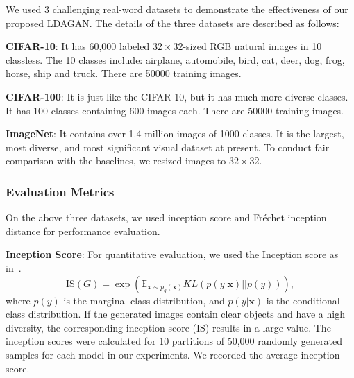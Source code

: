 \documentclass{article}
\begin{document}
We used 3 challenging real-word datasets to demonstrate the effectiveness of our proposed LDAGAN.
The details of the three datasets are described as follows:

\noindent\textbf{CIFAR-10}: It has 60,000 labeled $32\times32$-sized RGB natural images in 10 classless.
The 10 classes include: airplane, automobile, bird, cat, deer, dog, frog, horse, ship and truck.
There are 50000 training images.

\noindent\textbf{CIFAR-100}: It is just like the CIFAR-10, but it has much more diverse classes.
It has 100 classes containing 600 images each.
There are 50000 training images.

\noindent\textbf{ImageNet}:  It contains over 1.4 million images of 1000 classes.
It is the largest,  most diverse, and most significant visual dataset at present.
To conduct fair comparison with the baselines, we resized images to $32\times32$.


\subsubsection{Evaluation Metrics}
\label{sec:EvaMetrics}

On the above three datasets, we used inception score and Fr\'{e}chet inception distance for performance evaluation.


\noindent\textbf{Inception Score}: For quantitative evaluation, we used the Inception score as in~\cite{salimans2016improved}.
\begin{equation}
\mathrm{IS} \left(G\right)
=
\exp
\left(
\mathbb{E}_{\mathbf{x}\sim p_g\left(\mathbf{x}\right)}
KL\left(p\left(y|\mathbf{x}\right) || p\left(y\right)\right)
\right),
\end{equation}
where $p\left(y\right)$ is the marginal class distribution, and $p\left(y|\mathbf{x}\right)$ is the conditional class distribution.
If the generated images contain clear objects and have a high diversity, the corresponding inception score (IS) results in a large value.
The inception scores were calculated for 10 partitions of 50,000 randomly generated samples for each model in our experiments.
We recorded the average inception score.
\end{document}
